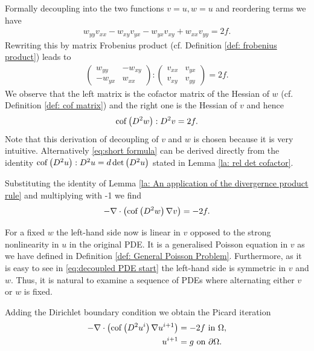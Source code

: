 Formally decoupling into the two functions $v = u ,w = u$ and reordering terms we have
\begin{align}
	w_{yy} v_{xx}- w_{xy} v_{yx} - w_{yx} v_{xy} +w_{xx} v_{yy} = 2f. \label{eq:decoupled PDE start}
\end{align}
Rewriting this by matrix Frobenius product (cf. Definition \ref{def: frobenius product}) leads to
\begin{align}
 \begin{pmatrix} w_{yy} & -w_{xy}  \\ -w_{yx} & w_{xx} \end{pmatrix}: \begin{pmatrix} v_{xx} & v_{yx}  \\  v_{xy} & v_{yy} \end{pmatrix} = 2f.
\end{align}
We observe that the left matrix is the cofactor matrix of the Hessian of $w$ (cf. Definition \ref{def: cof matrix}) and the right one is the Hessian of $v$ and hence
\begin{align}
		\operatorname{cof} \left( D^2 w  \right):D^2 v  = 2f. \label{eq:short formula}
\end{align}
Note that this derivation of decoupling of $v$ and $w$ is chosen because it is very intuitive. Alternatively \eqref{eq:short formula} can be derived directly from the identity $\operatorname{cof} \left( D^2 u  \right):D^2 u  = d \det{\left(D^2 u\right)}$ stated in Lemma \ref{la: rel det cofactor}.

Substituting the identity of Lemma \ref{la: An application of the divergernce product rule} and multiplying with -1 we find
\begin{align}
	- \nabla \cdot \left( \operatorname{cof} \left(  D^2 w \right) \nabla v \right)  = -2f.  \label{eq:decoupled PDE}
\end{align}

For a fixed $w$ the left-hand side now is linear in $v$ opposed to the strong nonlinearity in $u$ in the original PDE. It is a generalised Poisson equation in $v$ as we have defined in Definition \ref{def: General Poisson Problem}. 
Furthermore, as it is easy to see in \eqref{eq:decoupled PDE start} the left-hand side is symmetric in $v$ and $w$. Thus, it is natural to examine a sequence of PDEs where alternating either $v$ or $w$ is fixed. 

Adding the Dirichlet boundary condition we obtain the Picard iteration
\begin{align}
	\begin{split}
	- \nabla \cdot \left( \operatorname{cof} \left(  D^2 u^i \right) \nabla u^{i+1} \right)  &= -2f  \text{ in } \Omega, \\
		u^{i+1} &= g \textnormal{ on } \partial \Omega.
	\label{eq:fixed point iteration}
	\end{split}
\end{align}

